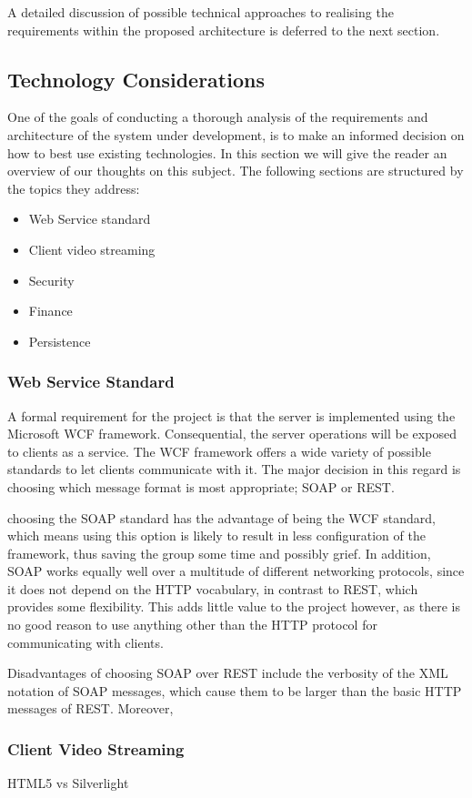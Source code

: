 A detailed discussion of possible technical approaches to realising the requirements within the proposed architecture is deferred to the next section.
\subsection{Technology Considerations}
One of the goals of conducting a thorough analysis of the requirements and architecture of the system under development, is to make an informed decision on how to best use existing technologies. In this section we will give the reader an overview of our thoughts on this subject. The following sections are structured by the topics they address:
\begin{itemize}
\item Web Service standard
\item Client video streaming
\item Security
\item Finance
\item Persistence
\end{itemize}
\subsubsection{Web Service Standard}
A formal requirement for the project is that the server is implemented using the Microsoft WCF framework. Consequential, the server operations will be exposed to clients as a service. The WCF framework offers a wide variety of possible standards to let clients communicate with it. The major decision in this regard is choosing which message format is most appropriate; SOAP or REST.

choosing the SOAP standard has the advantage of being the WCF standard, which means using this option is likely to result in less configuration of the framework, thus saving the group some time and possibly grief. In addition, SOAP works equally well over a multitude of different networking protocols, since it does not depend on the HTTP vocabulary, in contrast to REST, which provides some flexibility. This adds little value to the project however, as there is no good reason to use anything other than the HTTP protocol for communicating with clients.

Disadvantages of choosing SOAP over REST include the verbosity of the XML notation of SOAP messages, which cause them to be larger than the basic HTTP messages of REST. Moreover, 
\subsubsection{Client Video Streaming}
HTML5 vs Silverlight\\
